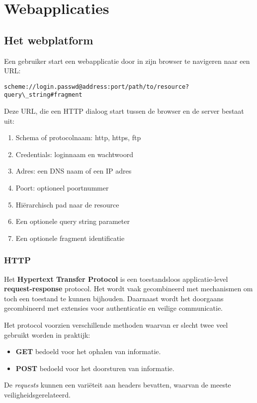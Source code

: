 \documentclass[../main.tex]{subfiles}
\begin{document}
\chapter{Webapplicaties}

\section{Het webplatform}
Een gebruiker start een webapplicatie door in zijn browser te navigeren naar een URL:

\begin{lstlisting}[caption=URL]
scheme://login.passwd@address:port/path/to/resource?query\_string#fragment
\end{lstlisting}
Deze URL, die een HTTP dialoog start tussen de browser en de server bestaat uit:
\begin{multicols}{2}
\begin{enumerate}
	\item Schema of protocolnaam: http, https, ftp
	\item Credentials: loginnaam en wachtwoord
	\item Adres: een DNS naam of een IP adres
	\item Poort: optioneel poortnummer
	\item Hi\"erarchisch pad naar de resource
	\item Een optionele query string parameter
	\item Een optionele fragment identificatie
\end{enumerate}
\end{multicols}

\subsection{HTTP}
Het \textbf{Hypertext Transfer Protocol} is een toestandsloos applicatie-level \textbf{request-response} protocol. Het wordt vaak gecombineerd met mechanismen om toch een toestand te kunnen bijhouden. Daarnaast wordt het doorgaans gecombineerd met extensies voor authenticatie en veilige communicatie.

Het protocol voorzien verschillende methoden waarvan er slecht twee veel gebruikt worden in praktijk:
\begin{itemize}
	\item \textbf{GET} bedoeld voor het ophalen van informatie.
	\item \textbf{POST} bedoeld voor het doorsturen van informatie.
\end{itemize}
De \textit{requests} kunnen een vari\"eteit aan headers bevatten, waarvan de meeste veiligheidsgerelateerd.
\end{document}
